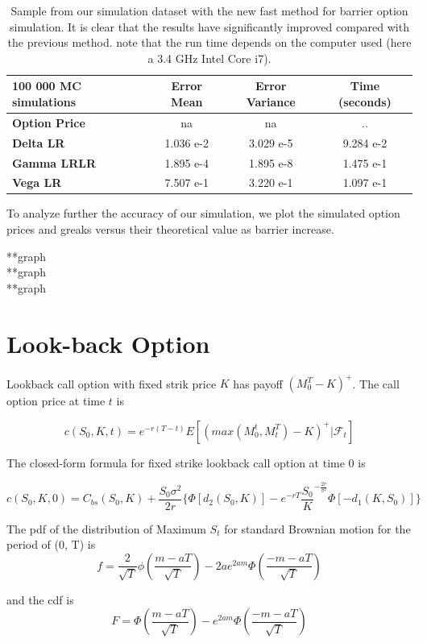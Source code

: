 \documentclass[11pt,a4paper,fleqn,draft]{article}
\begin{document}
\begin{table}
\centering
\begin{tabular}{|l|c|c|c|}
\hline
100 000 MC simulations      & \textbf{Error Mean} & \textbf{Error Variance} & \textbf{Time (seconds)} \\ \hline
\textbf{Option Price} & na &          na         & .. \\ \hline
\textbf{Delta LR} & 1.036 e-2 & 3.029 e-5 & 9.284 e-2\\ \hline
\textbf{Gamma LRLR} & 1.895 e-4 & 1.895 e-8& 1.475 e-1\\ \hline
\textbf{Vega LR} & 7.507 e-1 & 3.220 e-1 & 1.097 e-1\\ \hline
\end{tabular}
\caption{Sample from our simulation dataset with the new fast method for barrier option simulation. It is clear that the results have significantly improved compared with the previous method. note that the run time depends on the computer used (here a 3.4 GHz Intel Core i7).}
\end{table}



To analyze further the accuracy of our simulation, we plot the simulated option prices and greaks versus their theoretical value as barrier increase.

**graph\\
**graph\\
**graph\\


\section{Look-back Option}

Lookback call option with fixed strik price $K$ has payoff $(M^T_{0}-K)^+$. The call option price at time $t$ is

$$c(S_0,K,t) = e^{-r(T-t)}E[(max(M^t_0,M^T_t)-K)^+|\mathcal{F}_t] $$

The closed-form formula for fixed strike lookback call option at time 0 \cite{lectures} is

$$c(S_0,K,0)=C_{bs}(S_0,K) + \frac{S_0\sigma^2}{2r}\{ \Phi[d_2(S_0,K)]-e^{-rT}\frac{S_0}{K}^{-\frac{2r}{\sigma^2}} \Phi[-d_1(K,S_0)]\}$$


The pdf of the distribution of Maximum $S_t$ for standard Brownian motion for the period of (0, T) is 
$$f = \frac{2}{\sqrt{T}}\phi (\frac{m-aT}{\sqrt{T}})-2ae^{2am}\Phi(\frac{-m-aT}{\sqrt{T}})$$

and the cdf is 
$$F = \Phi(\frac{m-aT}{\sqrt{T}})-e^{2am}\Phi(\frac{-m-aT}{\sqrt{T}})$$
\end{document}
